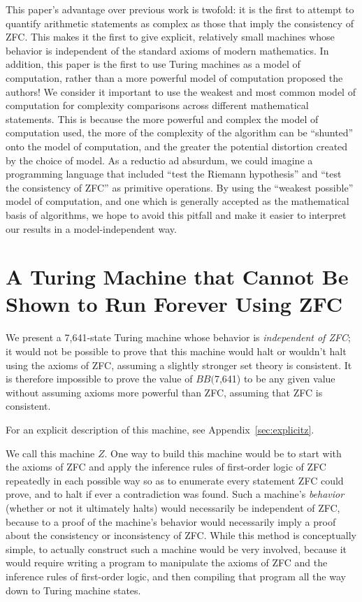\documentclass[11pt]{article}
\newcommand{\statenumstate}{7,641-state }
\newcommand{\bbstatenum}{$BB($7,641) }
\begin{document}
This paper's advantage over previous work is twofold: it is the first to attempt to quantify arithmetic statements as complex as those that imply the consistency of ZFC. This makes it the first to give explicit, relatively small machines whose behavior is independent of the standard axioms of modern mathematics. In addition, this paper is the first to use Turing machines as a model of computation, rather than a more powerful model of computation proposed the authors! We consider it important to use the weakest and most common model of computation for complexity comparisons across different mathematical statements. This is because the more powerful and complex the model of computation used, the more of the complexity of the algorithm can be ``shunted'' onto the model of computation, and the greater the potential distortion created by the choice of model. As a reductio ad absurdum, we could imagine a programming language that included ``test the Riemann hypothesis'' and ``test the consistency of ZFC'' as primitive operations. By using the ``weakest possible'' model of computation, and one which is generally accepted as the mathematical basis of algorithms, we hope to avoid this pitfall and make it easier to interpret our results in a model-independent way.

\section{A Turing Machine that Cannot Be Shown to Run Forever Using ZFC}

We present a \statenumstate Turing machine whose behavior is \emph{independent of ZFC}; it would not be possible to prove that this machine would halt or wouldn't halt using the axioms of ZFC, assuming a slightly stronger set theory is consistent. It is therefore impossible to prove the value of \bbstatenum to be any given value without assuming axioms more powerful than ZFC, assuming that ZFC is consistent.

For an explicit description of this machine, see Appendix~\ref{sec:explicitz}. 

We call this machine $Z$. One way to build this machine would be to start with the axioms of ZFC and apply the inference rules of first-order logic of ZFC repeatedly in each possible way so as to enumerate every statement ZFC could prove, and to halt if ever a contradiction was found. Such a machine's \emph{behavior} (whether or not it ultimately halts) would necessarily be independent of ZFC, because to a proof of the machine's behavior would necessarily imply a proof about the consistency or inconsistency of ZFC. While this method is conceptually simple, to actually construct such a machine would be very involved, because it would require writing a program to manipulate the axioms of ZFC and the inference rules of first-order logic, and then compiling that program all the way down to Turing machine states. 
\end{document}
